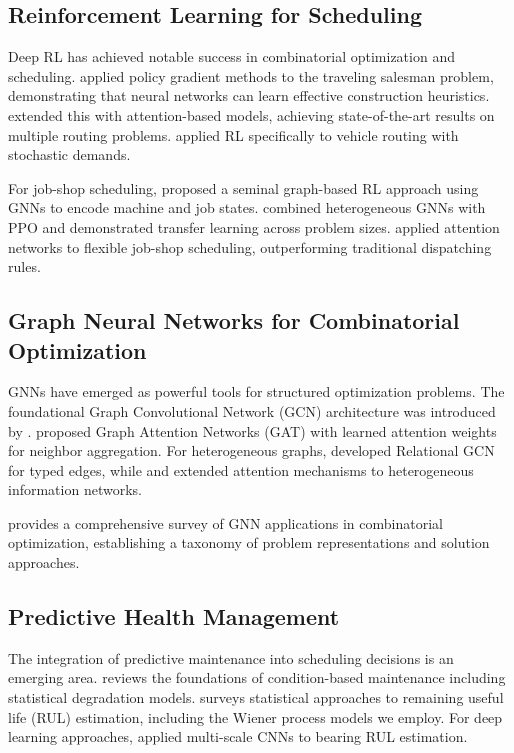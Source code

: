 \documentclass[11pt,a4paper]{article}
\begin{document}
\subsection{Reinforcement Learning for Scheduling}

Deep RL has achieved notable success in combinatorial optimization and scheduling. \citet{bello2017neural} applied policy gradient methods to the traveling salesman problem, demonstrating that neural networks can learn effective construction heuristics. \citet{kool2019attention} extended this with attention-based models, achieving state-of-the-art results on multiple routing problems. \citet{nazari2018reinforcement} applied RL specifically to vehicle routing with stochastic demands.

For job-shop scheduling, \citet{zhang2020learning} proposed a seminal graph-based RL approach using GNNs to encode machine and job states. \citet{park2021learning} combined heterogeneous GNNs with PPO and demonstrated transfer learning across problem sizes. \citet{wang2021dynamic} applied attention networks to flexible job-shop scheduling, outperforming traditional dispatching rules.

\subsection{Graph Neural Networks for Combinatorial Optimization}

GNNs have emerged as powerful tools for structured optimization problems. The foundational Graph Convolutional Network (GCN) architecture was introduced by \citet{kipf2017semi}. \citet{velickovic2018graph} proposed Graph Attention Networks (GAT) with learned attention weights for neighbor aggregation. For heterogeneous graphs, \citet{schlichtkrull2018modeling} developed Relational GCN for typed edges, while \citet{wang2019heterogeneous} and \citet{hu2020heterogeneous} extended attention mechanisms to heterogeneous information networks.

\citet{cappart2023combinatorial} provides a comprehensive survey of GNN applications in combinatorial optimization, establishing a taxonomy of problem representations and solution approaches.

\subsection{Predictive Health Management}

The integration of predictive maintenance into scheduling decisions is an emerging area. \citet{jardine2006review} reviews the foundations of condition-based maintenance including statistical degradation models. \citet{si2011remaining} surveys statistical approaches to remaining useful life (RUL) estimation, including the Wiener process models we employ. For deep learning approaches, \citet{zhu2019estimation} applied multi-scale CNNs to bearing RUL estimation.
\end{document}
